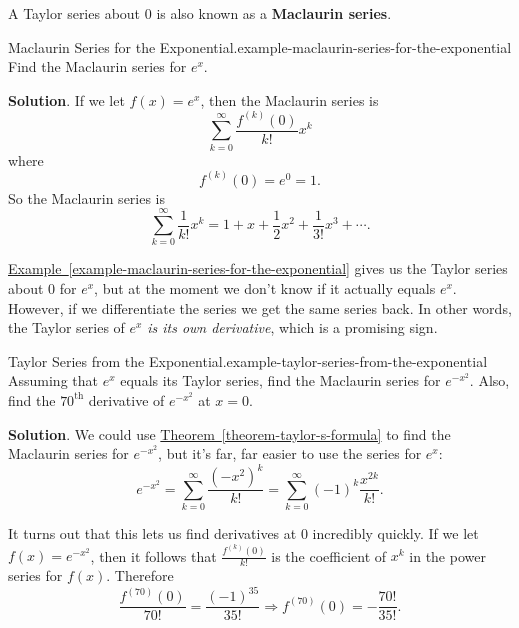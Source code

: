 \documentclass[10pt,]{book}
\newcommand{\terminology}[1]{\textbf{#1}}
\numberwithin{equation}{section}
\begin{document}
\hypertarget{p-963}{}%
A Taylor series about \(0\) is also known as a \terminology{Maclaurin series}.%
\begin{example}{Maclaurin Series for the Exponential.}{example-maclaurin-series-for-the-exponential}%
\hypertarget{p-964}{}%
Find the Maclaurin series for \(e^{x}\).%
\par\smallskip%
\noindent\textbf{Solution}.\hypertarget{solution-195}{}\quad%
\hypertarget{p-965}{}%
If we let \(f(x) = e^{x}\), then the Maclaurin series is%
\begin{equation*}
\sum_{k=0}^{\infty}\frac{f^{(k)}(0)}{k!}x^{k}
\end{equation*}
where%
\begin{equation*}
f^{(k)}(0) = e^{0} = 1\text{.}
\end{equation*}
So the Maclaurin series is%
\begin{equation*}
\sum_{k=0}^{\infty}\frac{1}{k!}x^{k} = 1 + x + \frac{1}{2}x^{2} + \frac{1}{3!}x^{3} + \cdots\text{.}
\end{equation*}
%
\end{example}
\hypertarget{p-966}{}%
\hyperref[example-maclaurin-series-for-the-exponential]{Example~\ref{example-maclaurin-series-for-the-exponential}} gives us the Taylor series about \(0\) for \(e^{x}\), but at the moment we don't know if it actually equals \(e^{x}\). However, if we differentiate the series we get the same series back. In other words, the Taylor series of \(e^{x}\) \emph{is its own derivative}, which is a promising sign.%
\begin{example}{Taylor Series from the Exponential.}{example-taylor-series-from-the-exponential}%
\hypertarget{p-967}{}%
Assuming that \(e^{x}\) equals its Taylor series, find the Maclaurin series for \(e^{-x^{2}}\). Also, find the \(70^{\text{th}}\) derivative of \(e^{-x^{2}}\) at \(x = 0\).%
\par\smallskip%
\noindent\textbf{Solution}.\hypertarget{solution-196}{}\quad%
\hypertarget{p-968}{}%
We could use \hyperref[theorem-taylor-s-formula]{Theorem~\ref{theorem-taylor-s-formula}} to find the Maclaurin series for \(e^{-x^{2}}\), but it's far, far easier to use the series for \(e^{x}\):%
\begin{equation*}
e^{-x^{2}} = \sum_{k=0}^{\infty}\frac{(-x^{2})^{k}}{k!} = \sum_{k=0}^{\infty}(-1)^{k}\frac{x^{2k}}{k!}\text{.}
\end{equation*}
%
\par
\hypertarget{p-969}{}%
It turns out that this lets us find derivatives at \(0\) incredibly quickly. If we let \(f(x) = e^{-x^{2}}\), then it follows that \(\frac{f^{(k)}(0)}{k!}\) is the coefficient of \(x^{k}\) in the power series for \(f(x)\). Therefore%
\begin{equation*}
\frac{f^{(70)}(0)}{70!} = \frac{(-1)^{35}}{35!} \Rightarrow f^{(70)}(0) = -\frac{70!}{35!}\text{.}
\end{equation*}
%
\end{example}
\end{document}
